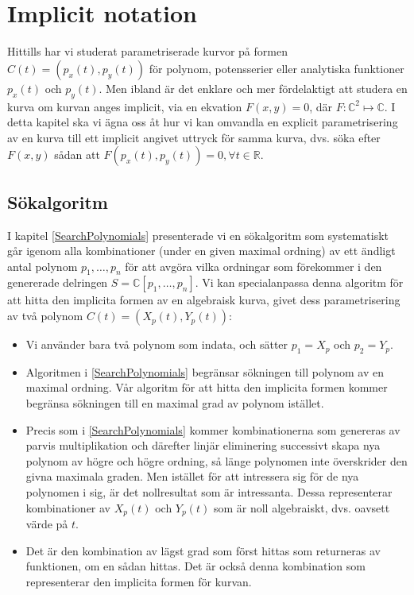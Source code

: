 \chapter{Implicit notation}

Hittills har vi studerat parametriserade kurvor på formen $C(t)=(p_x(t),p_y(t))$ för polynom, potensserier eller analytiska funktioner $p_x(t)$ och $p_y(t)$. Men ibland är det enklare och mer fördelaktigt att studera en kurva om kurvan anges implicit, via en ekvation $F(x,y)=0$, där $F: \mathbb{C}^2 \mapsto \mathbb{C}$. I detta kapitel ska vi ägna oss åt hur vi kan omvandla en explicit parametrisering av en kurva till ett implicit angivet uttryck för samma kurva, dvs. söka efter $F(x,y)$ sådan att $F(p_x(t),p_y(t))=0,\forall t \in \mathbb{R}$.

\section{Sökalgoritm}

I kapitel \ref{SearchPolynomials} presenterade vi en sökalgoritm som systematiskt går igenom alla kombinationer (under en given maximal ordning) av ett ändligt antal polynom $p_1,\ldots,p_n$ för att avgöra vilka ordningar som förekommer i den genererade delringen $S=\mathbb{C}\left[p_1,\ldots,p_n\right]$. Vi kan specialanpassa denna algoritm för att hitta den implicita formen av en algebraisk kurva, givet dess parametrisering av två polynom $C(t)=\left(X_p(t),Y_p(t)\right)$:

\begin{itemize}
\item Vi använder bara två polynom som indata, och sätter $p_1=X_p$ och $p_2=Y_p$.

\item Algoritmen i \ref{SearchPolynomials} begränsar sökningen till polynom av en maximal ordning. Vår algoritm för att hitta den implicita formen kommer begränsa sökningen till en maximal grad av polynom istället.

\item Precis som i \ref{SearchPolynomials} kommer kombinationerna som genereras av parvis multiplikation och därefter linjär eliminering successivt skapa nya polynom av högre och högre ordning, så länge polynomen inte överskrider den givna maximala graden. Men istället för att intressera sig för de nya polynomen i sig, är det nollresultat som är intressanta. Dessa representerar kombinationer av $X_p(t)$ och $Y_p(t)$ som är noll algebraiskt, dvs. oavsett värde på $t$.

\item Det är den kombination av lägst grad som först hittas som returneras av funktionen, om en sådan hittas. Det är också denna kombination som representerar den implicita formen för kurvan.
\end{itemize}

